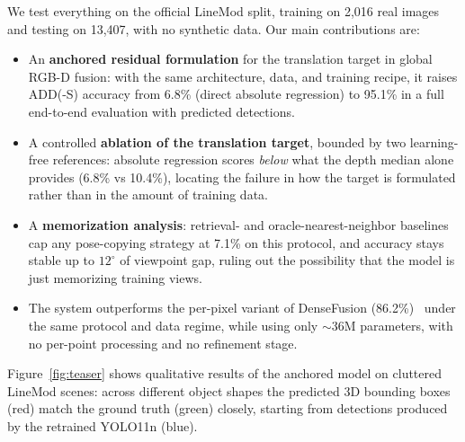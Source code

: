 We test everything on the official LineMod split, training on 2{,}016 real images and testing on 13{,}407, with no synthetic data. Our main contributions are:

\begin{itemize}
    \item An \textbf{anchored residual formulation} for the translation target in global RGB-D fusion: with the same architecture, data, and training recipe, it raises ADD(-S) accuracy from 6.8\% (direct absolute regression) to 95.1\% in a full end-to-end evaluation with predicted detections.
    \item A controlled \textbf{ablation of the translation target}, bounded by two learning-free references: absolute regression scores \emph{below} what the depth median alone provides (6.8\% vs 10.4\%), locating the failure in how the target is formulated rather than in the amount of training data.
    \item A \textbf{memorization analysis}: retrieval- and oracle-nearest-neighbor baselines cap any pose-copying strategy at 7.1\% on this protocol, and accuracy stays stable up to $12^\circ$ of viewpoint gap, ruling out the possibility that the model is just memorizing training views.
    \item The system outperforms the per-pixel variant of DenseFusion (86.2\%)~\cite{wang2019densefusion} under the same protocol and data regime, while using only $\sim$36M parameters, with no per-point processing and no refinement stage.
\end{itemize}

Figure~\ref{fig:teaser} shows qualitative results of the anchored model on cluttered LineMod scenes: across different object shapes the predicted 3D bounding boxes (red) match the ground truth (green) closely, starting from detections produced by the retrained YOLO11n (blue).


